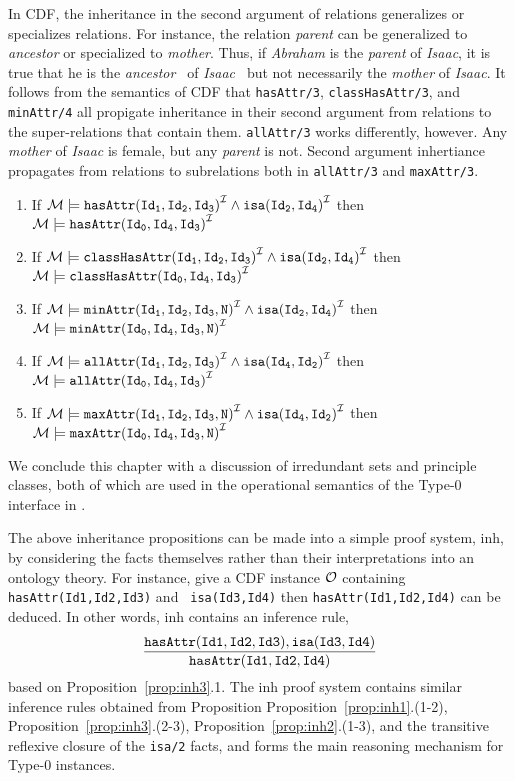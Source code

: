 In CDF, the inheritance in the second argument of relations
generalizes or specializes relations.  For instance, the relation {\it
parent} can be generalized to {\it ancestor} or specialized to {\it
mother}.  Thus, if {\it Abraham} is the {\it parent} of {\it Isaac},
it is true that he is the {\it ancestor\ } of {\it Isaac\ } but not
necessarily the {\it mother} of {\it Isaac}.  It follows from the
semantics of CDF that {\tt hasAttr/3}, {\tt classHasAttr/3}, and {\tt
minAttr/4} all propigate inheritance in their second argument from
relations to the super-relations that contain them.  {\tt allAttr/3}
works differently, however.  Any {\it mother} of {\it Isaac} is
female, but any {\it parent} is not.  Second argument inhertiance
propagates from relations to subrelations both in {\tt allAttr/3} and
{\tt maxAttr/3}.

\begin{proposition}
\label{prop:inh2} \rm 
\end{proposition} 
\begin{enumerate}
\item If ${\cal M} \models {\tt hasAttr(Id_1,Id_2,Id_3)}^{{\cal I}} \wedge
				{\tt isa(Id_2,Id_4)}^{{\cal I}}$ 
	then ${\cal M} \models {\tt hasAttr(Id_0,Id_4,Id_3)}^{{\cal I}} $ 
%
\item If ${\cal M} \models {\tt classHasAttr(Id_1,Id_2,Id_3)}^{{\cal I}} \wedge
				{\tt isa(Id_2,Id_4)}^{{\cal I}}$ 
	then ${\cal M} \models {\tt classHasAttr(Id_0,Id_4,Id_3)}^{{\cal I}} $ 
%
\item If ${\cal M} \models {\tt minAttr(Id_1,Id_2,Id_3,N)}^{{\cal I}} \wedge
				{\tt isa(Id_2,Id_4)}^{{\cal I}}$ 
	then ${\cal M} \models {\tt minAttr(Id_0,Id_4,Id_3,N)}^{{\cal I}} $ 
%
\item If ${\cal M} \models {\tt allAttr(Id_1,Id_2,Id_3)}^{{\cal I}} \wedge
				{\tt isa(Id_4,Id_2)}^{{\cal I}}$ 
	then ${\cal M} \models {\tt allAttr(Id_0,Id_4,Id_3)}^{{\cal I}} $ 
\item If ${\cal M} \models {\tt maxAttr(Id_1,Id_2,Id_3,N)}^{{\cal I}} \wedge
				{\tt isa(Id_4,Id_2)}^{{\cal I}}$ 
	then ${\cal M} \models {\tt maxAttr(Id_0,Id_4,Id_3,N)}^{{\cal I}} $ 
\end{enumerate}

We conclude this chapter with a discussion of irredundant sets and
principle classes, both of which are used in the operational semantics
of the Type-0 interface in .

The above inheritance propositions can be made into a simple proof
system, {\sc inh}, by considering the facts themselves rather than
their interpretations into an ontology theory.  For instance, give a
CDF instance ${\cal O}$ containing {\tt hasAttr(Id1,Id2,Id3)} and {\tt
isa(Id3,Id4)} then {\tt hasAttr(Id1,Id2,Id4)} can be deduced.  In
other words, {\sc inh} contains an inference rule,
\[
\frac{{\tt hasAttr(Id1,Id2,Id3)},{\tt isa(Id3,Id4)}}{{\tt hasAttr(Id1,Id2,Id4)}}
\]
based on Proposition~\ref{prop:inh3}.1.  The {\sc inh} proof system
contains similar inference rules obtained from Proposition
Proposition~\ref{prop:inh1}.(1-2), Proposition~\ref{prop:inh3}.(2-3),
Proposition~\ref{prop:inh2}.(1-3), and the transitive reflexive
closure of the {\tt isa/2} facts, and forms the main reasoning
mechanism for Type-0 instances.

